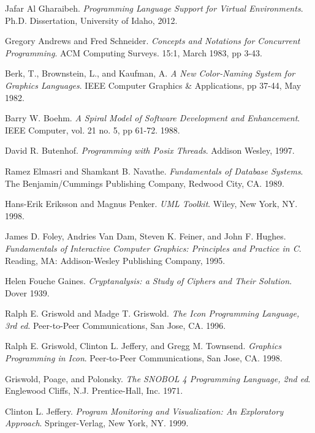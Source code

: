 \begin{thebibliography}{ABCD}

  \bibitem[]{} Jafar Al Gharaibeh.  \emph{Programming Language Support for
    Virtual Environments}. Ph.D. Dissertation, University of Idaho, 2012.

  \bibitem[]{} Gregory Andrews and Fred Schneider.  \emph{Concepts and Notations
    for Concurrent Programming}. ACM Computing Surveys. 15:1, March 1983, pp 3-43.

  \bibitem[]{} Berk, T., Brownstein, L., and Kaufman, A.  \emph{A New
    Color-Naming System for Graphics Languages}. IEEE Computer Graphics \&
    Applications, pp 37-44, May 1982.

  \bibitem[]{} Barry W. Boehm. \emph{A Spiral Model of Software Development and
    Enhancement}.  IEEE Computer, vol. 21 no. 5, pp 61-72. 1988.

  \bibitem[]{} David R. Butenhof. \emph{Programming with Posix Threads}.
    Addison Wesley, 1997.

  \bibitem[]{} Ramez Elmasri and Shamkant B. Navathe. \emph{Fundamentals of
    Database Systems}.  The Benjamin/Cummings Publishing Company, Redwood City,
    CA. 1989.

  \bibitem[]{} Hans-Erik Eriksson and Magnus Penker. \emph{UML Toolkit}. Wiley,
    New York, NY.  1998.

  \bibitem[]{} James D. Foley, Andries Van Dam, Steven K. Feiner, and John
    F. Hughes.  \emph{Fundamentals of Interactive Computer Graphics: Principles
      and Practice in C}. Reading, MA: Addison-Wesley Publishing Company, 1995.

  \bibitem[]{} Helen Fouche Gaines. \emph{Cryptanalysis: a Study of Ciphers and
    Their Solution}. Dover 1939.

  \bibitem[]{} Ralph E. Griswold and Madge T. Griswold. \emph{The Icon
    Programming Language, 3rd ed}. Peer-to-Peer Communications, San Jose,
    CA. 1996.

  \bibitem[]{} Ralph E. Griswold, Clinton L. Jeffery, and Gregg
    M. Townsend. \emph{Graphics Programming in Icon}. Peer-to-Peer
    Communications, San Jose, CA. 1998.

  \bibitem[]{} Griswold, Poage, and Polonsky. \emph{The SNOBOL 4 Programming
    Language, 2nd ed}. Englewood Cliffs, N.J. Prentice-Hall, Inc. 1971.

  \bibitem[]{} Clinton L. Jeffery. \emph{Program Monitoring and Visualization:
    An Exploratory Approach}. Springer-Verlag, New York, NY. 1999.


\end{thebibliography}
